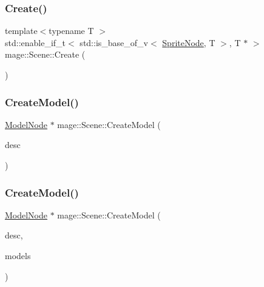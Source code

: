\hypertarget{classmage_1_1_scene_a129ef3142ac5912978b0457c9d89f1ea}{}\label{classmage_1_1_scene_a129ef3142ac5912978b0457c9d89f1ea} 
\subsubsection{\texorpdfstring{Create()}{Create()}\hspace{0.1cm}{\footnotesize\ttfamily [7/7]}}
{\footnotesize\ttfamily template$<$typename T $>$ \\
std\+::enable\+\_\+if\+\_\+t$<$ std\+::is\+\_\+base\+\_\+of\+\_\+v$<$ \hyperlink{classmage_1_1_sprite_node}{Sprite\+Node}, T $>$, T $\ast$ $>$ mage\+::\+Scene\+::\+Create (\begin{DoxyParamCaption}{ }\end{DoxyParamCaption})}

\hypertarget{classmage_1_1_scene_abad1434f1a35a98eece02942c588fa98}{}\label{classmage_1_1_scene_abad1434f1a35a98eece02942c588fa98} 
\subsubsection{\texorpdfstring{Create\+Model()}{CreateModel()}\hspace{0.1cm}{\footnotesize\ttfamily [1/2]}}
{\footnotesize\ttfamily \hyperlink{classmage_1_1_model_node}{Model\+Node} $\ast$ mage\+::\+Scene\+::\+Create\+Model (\begin{DoxyParamCaption}\item[{const \hyperlink{classmage_1_1_model_descriptor}{Model\+Descriptor} \&}]{desc }\end{DoxyParamCaption})}

\hypertarget{classmage_1_1_scene_a2edda899627d9829c8799353c603f70e}{}\label{classmage_1_1_scene_a2edda899627d9829c8799353c603f70e} 
\subsubsection{\texorpdfstring{Create\+Model()}{CreateModel()}\hspace{0.1cm}{\footnotesize\ttfamily [2/2]}}
{\footnotesize\ttfamily \hyperlink{classmage_1_1_model_node}{Model\+Node} $\ast$ mage\+::\+Scene\+::\+Create\+Model (\begin{DoxyParamCaption}\item[{const \hyperlink{classmage_1_1_model_descriptor}{Model\+Descriptor} \&}]{desc,  }\item[{vector$<$ \hyperlink{classmage_1_1_model_node}{Model\+Node} $\ast$ $>$ \&}]{models }\end{DoxyParamCaption})}

